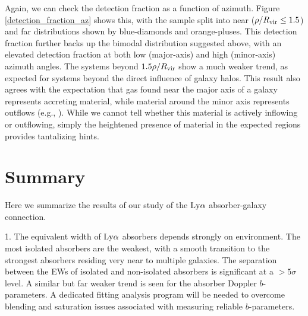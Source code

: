 Again, we can check the detection fraction as a function of azimuth. Figure \ref{detection_fraction_az} shows this, with the sample split into near ($\rho / R_{\rm vir} \leq 1.5$) and far distributions shown by blue-diamonds and orange-pluses. This detection fraction further backs up the bimodal distribution suggested above, with an elevated detection fraction at both low (major-axis) and high (minor-axis) azimuth angles. The systems beyond $1.5 \rho / R_{\rm vir}$ show a much weaker trend, as expected for systems beyond the direct influence of galaxy halos. This result also agrees with the expectation that gas found near the major axis of a galaxy represents accreting material, while material around the minor axis represents outflows (e.g., \citealt{bordoloi2011, bouche2012, kacprzak2012, bordoloi2014, nielsen2015}). While we cannot tell whether this material is actively inflowing or outflowing, simply the heightened presence of material in the expected regions provides tantalizing hints.




\section{Summary}
Here we summarize the results of our study of the $\rm Ly\alpha$ absorber-galaxy connection.

1. The equivalent width of $\rm Ly\alpha$ absorbers depends strongly on environment. The most isolated absorbers are the weakest, with a smooth transition to the strongest absorbers residing very near to multiple galaxies. The separation between the EWs of isolated and non-isolated absorbers is significant at a $> 5\sigma$ level. A similar but far weaker trend is seen for the absorber Doppler $b$-parameters. A dedicated fitting analysis program will be needed to overcome blending and saturation issues associated with measuring reliable $b$-parameters.


